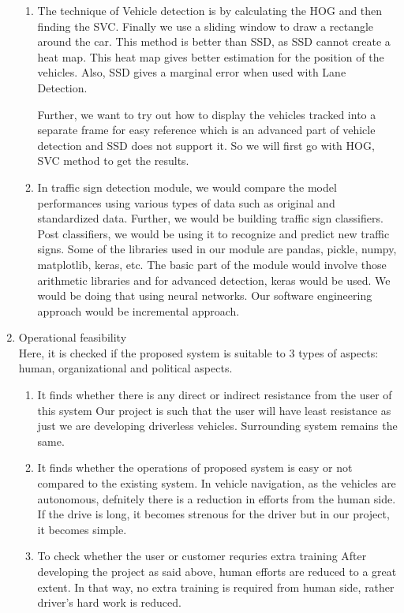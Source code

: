 \documentclass[12pt,a4paper,final]{article}
\begin{document}
\begin{flushleft}
\begin{enumerate}
\begin{enumerate}
\item
The technique of Vehicle detection is by calculating the HOG and then finding the SVC. Finally we use a sliding window to draw a rectangle around the car. This method is better than SSD, as SSD cannot create a heat map. This heat map gives better estimation for the position of the vehicles. Also, SSD gives a marginal error when used with Lane Detection.

Further, we want to try out how to display the vehicles tracked into a separate frame for easy reference which is an advanced part of vehicle detection and SSD does not support it. So we will first go with HOG, SVC method to get the results. 

\item
In traffic sign detection module, we would compare the model performances using various types of data such as original and standardized data. Further, we would be building traffic sign classifiers. Post classifiers, we would be using it to recognize and predict new traffic signs. Some of the libraries used in our module are pandas, pickle, numpy, matplotlib, keras, etc. The basic part of the module would involve those arithmetic libraries and for advanced detection, keras would be used. We would be doing that using neural networks. Our software engineering approach would be incremental approach.
\end{enumerate}
\item Operational feasibility \\
Here, it is checked if the proposed system is suitable to 3 types of aspects:
human, organizational and political aspects.
\begin{enumerate}
	
 
\item 
It finds whether there is any direct or indirect resistance from the user of this system
Our project is such that the user will have least resistance as just we are developing driverless vehicles. Surrounding system remains the same. 
\item 
It finds whether the operations of proposed system is easy or not compared to the existing system.
    In vehicle navigation, as the vehicles are autonomous, defnitely there is a reduction in efforts from the human side. If the drive is long, it becomes strenous for the driver but in our project, it becomes simple. 

\item
 To check whether the user or customer requries extra training
    After developing the project as said above, human efforts are reduced to a great extent. In that way, no extra training is required from human side, rather driver's hard work is reduced. 


\end{enumerate}
\end{enumerate}
\end{flushleft}
\end{document}
